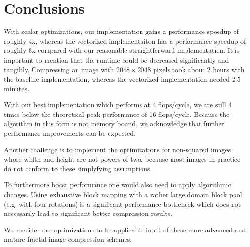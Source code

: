 \section{Conclusions}

With scalar optimizations, our implementation gains a performance speedup
of roughly 4x, whereas the vectorized implementaiton has a performance speedup
of roughly 8x compared with our reasonable straightforward implementation. It is important
to mention that the runtime could be decreased significantly and tangibly. Compressing
an image with $2048 \times 2048$ pixels took about 2 hours with the baseline implementation,
whereas the vectorized implementation needed 2.5 minutes.

With our best implementation which performs at 4 flops/cycle, we are still 4 times 
below the theoretical peak performance of 16 flops/cycle. Because the algorithm
in this form is not memory bound, we acknowledge that further performance improvements
can be expected.

Another challenge is to implement the optimizations for non-squared images whose
width and height are not powers of two, because most images in practice do not 
conform to these simplyfying assumptions.

To furthermore boost performance one would also need to apply algorithmic changes. 
Using exhaustive block mapping with a rather large
domain block pool (e.g. with four rotations) is a significant performance
bottleneck which does not necessarily lead to significant better compression results.

We consider our optimizations to be applicable in all of these more advanced
and mature fractal image compression schemes.